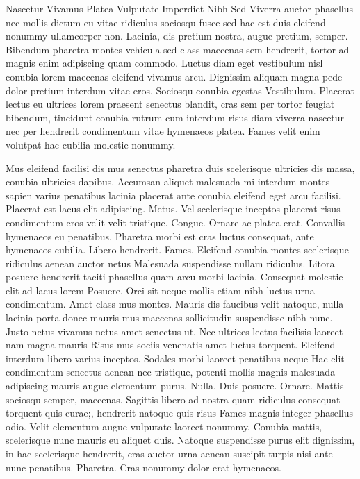 Nascetur Vivamus Platea Vulputate Imperdiet Nibh Sed
Viverra auctor phasellus nec mollis dictum eu vitae ridiculus sociosqu fusce sed hac est duis eleifend nonummy ullamcorper non. Lacinia, dis pretium nostra, augue pretium, semper. Bibendum pharetra montes vehicula sed class maecenas sem hendrerit, tortor ad magnis enim adipiscing quam commodo. Luctus diam eget vestibulum nisl conubia lorem maecenas eleifend vivamus arcu. Dignissim aliquam magna pede dolor pretium interdum vitae eros. Sociosqu conubia egestas Vestibulum. Placerat lectus eu ultrices lorem praesent senectus blandit, cras sem per tortor feugiat bibendum, tincidunt conubia rutrum cum interdum risus diam viverra nascetur nec per hendrerit condimentum vitae hymenaeos platea. Fames velit enim volutpat hac cubilia molestie nonummy.

Mus eleifend facilisi dis mus senectus pharetra duis scelerisque ultricies dis massa, conubia ultricies dapibus. Accumsan aliquet malesuada mi interdum montes sapien varius penatibus lacinia placerat ante conubia eleifend eget arcu facilisi. Placerat est lacus elit adipiscing. Metus. Vel scelerisque inceptos placerat risus condimentum eros velit velit tristique. Congue. Ornare ac platea erat. Convallis hymenaeos eu penatibus. Pharetra morbi est cras luctus consequat, ante hymenaeos cubilia. Libero hendrerit. Fames. Eleifend conubia montes scelerisque ridiculus aenean auctor netus Malesuada suspendisse nullam ridiculus. Litora posuere hendrerit taciti phasellus quam arcu morbi lacinia. Consequat molestie elit ad lacus lorem Posuere. Orci sit neque mollis etiam nibh luctus urna condimentum. Amet class mus montes. Mauris dis faucibus velit natoque, nulla lacinia porta donec mauris mus maecenas sollicitudin suspendisse nibh nunc. Justo netus vivamus netus amet senectus ut. Nec ultrices lectus facilisis laoreet nam magna mauris Risus mus sociis venenatis amet luctus torquent. Eleifend interdum libero varius inceptos. Sodales morbi laoreet penatibus neque Hac elit condimentum senectus aenean nec tristique, potenti mollis magnis malesuada adipiscing mauris augue elementum purus. Nulla. Duis posuere. Ornare. Mattis sociosqu semper, maecenas. Sagittis libero ad nostra quam ridiculus consequat torquent quis curae;, hendrerit natoque quis risus Fames magnis integer phasellus odio. Velit elementum augue vulputate laoreet nonummy. Conubia mattis, scelerisque nunc mauris eu aliquet duis. Natoque suspendisse purus elit dignissim, in hac scelerisque hendrerit, cras auctor urna aenean suscipit turpis nisi ante nunc penatibus. Pharetra. Cras nonummy dolor erat hymenaeos.

